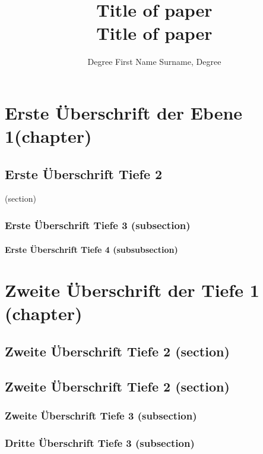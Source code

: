 \documentclass[Master, MBE, english]{twbook}
\title{Title of paper\\Title of paper}
\author{Degree First Name Surname, Degree}
\begin{document}
\maketitle

\Blinddocument

\chapter{Erste Überschrift der Ebene 1(chapter)}
\blinddocument

\blindmathpaper

\section{Erste Überschrift Tiefe 2}(section)
\blindtext 

\subsection{Erste Überschrift Tiefe 3 (subsection)}
\blindtext 

\subsubsection{Erste Überschrift Tiefe 4 (subsubsection)}
\blindtext

\chapter{Zweite Überschrift der Tiefe 1 (chapter)}
\blindtext  

\section{Zweite Überschrift Tiefe 2 (section)}
\blindtext  

\section{Zweite Überschrift Tiefe 2 (section)}
\blindtext 

\subsection{Zweite Überschrift Tiefe 3 (subsection)}
\blindtext 

\subsection{Dritte Überschrift Tiefe 3 (subsection)}
\blindtext 
 
\end{document}
